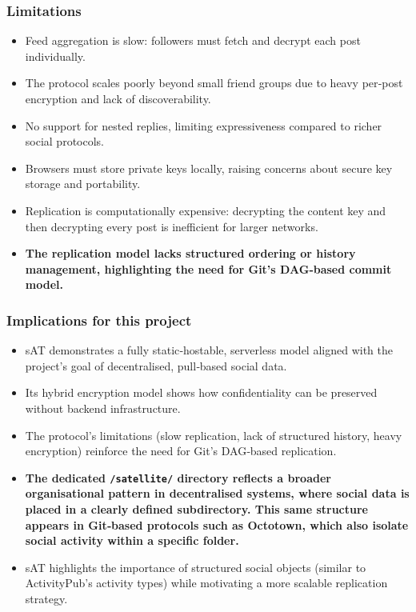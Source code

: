 \subsubsection{Limitations}
\begin{itemize}
    \item Feed aggregation is slow: followers must fetch and decrypt each post individually.
    \item The protocol scales poorly beyond small friend groups due to heavy per‑post encryption and lack of discoverability.
    \item No support for nested replies, limiting expressiveness compared to richer social protocols.
    \item Browsers must store private keys locally, raising concerns about secure key storage and portability.
    \item Replication is computationally expensive: decrypting the content key and then decrypting every post is inefficient for larger networks.
    \item \textbf{The replication model lacks structured ordering or history management, highlighting the need for Git’s DAG‑based commit model.}
\end{itemize}

\subsubsection{Implications for this project}
\begin{itemize}
    \item sAT demonstrates a fully static‑hostable, serverless model aligned with the project’s goal of decentralised, pull‑based social data.
    \item Its hybrid encryption model shows how confidentiality can be preserved without backend infrastructure.
    \item The protocol’s limitations (slow replication, lack of structured history, heavy encryption) reinforce the need for Git’s DAG‑based replication.
    \item \textbf{The dedicated \texttt{/satellite/} directory reflects a broader organisational pattern in decentralised systems, where social data is placed in a clearly defined subdirectory. This same structure appears in Git‑based protocols such as Octotown, which also isolate social activity within a specific folder.}
    \item sAT highlights the importance of structured social objects (similar to ActivityPub’s activity types) while motivating a more scalable replication strategy.
\end{itemize}


